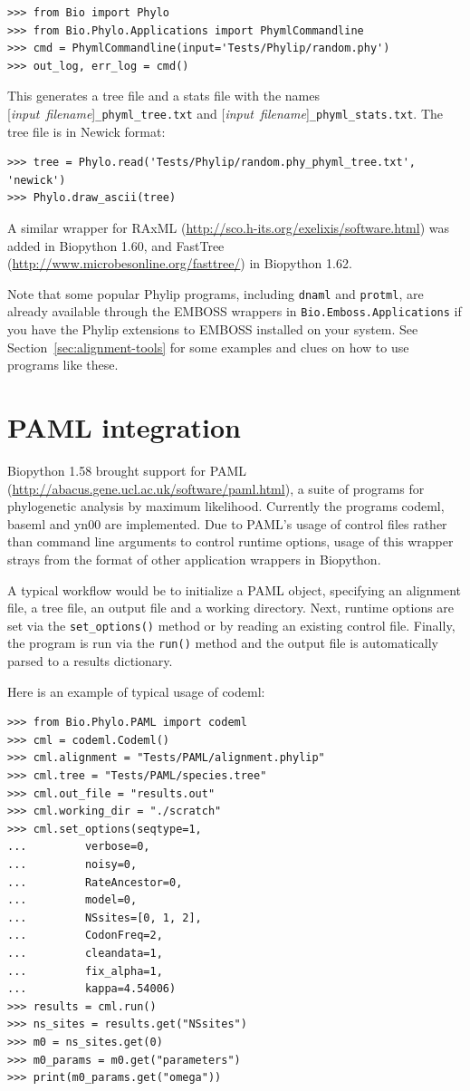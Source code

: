 \documentclass{report}
\begin{document}
\begin{verbatim}
>>> from Bio import Phylo
>>> from Bio.Phylo.Applications import PhymlCommandline
>>> cmd = PhymlCommandline(input='Tests/Phylip/random.phy')
>>> out_log, err_log = cmd()
\end{verbatim}

This generates a tree file and a stats file with the names
[\textit{input~filename}]\verb|_phyml_tree.txt| and
[\textit{input~filename}]\verb|_phyml_stats.txt|. The tree file is in Newick format:

\begin{verbatim}
>>> tree = Phylo.read('Tests/Phylip/random.phy_phyml_tree.txt', 'newick')
>>> Phylo.draw_ascii(tree)
\end{verbatim}

A similar wrapper for RAxML (\url{http://sco.h-its.org/exelixis/software.html})
was added in Biopython 1.60, and FastTree
(\url{http://www.microbesonline.org/fasttree/}) in Biopython 1.62.

Note that some popular Phylip programs, including \texttt{dnaml} and \texttt{protml},
are already available through the EMBOSS wrappers in \texttt{Bio.Emboss.Applications} if
you have the Phylip extensions to EMBOSS installed on your system.
See Section~\ref{sec:alignment-tools} for some examples and clues on how to use
programs like these.


\section{PAML integration}
\label{sec:PhyloPAML}

Biopython 1.58 brought support for PAML
(\url{http://abacus.gene.ucl.ac.uk/software/paml.html}), a suite of programs for
phylogenetic analysis by maximum likelihood. Currently the programs codeml, baseml and 
yn00 are implemented. Due to PAML's usage of control files rather than command line 
arguments to control runtime options, usage of this wrapper strays from the format of 
other application wrappers in Biopython. 

A typical workflow would be to initialize a PAML object, specifying an alignment file, a
tree file, an output file and a working directory. Next, runtime options are set via the
\texttt{set\_options()} method or by reading an existing control file. Finally, the
program is run via the \texttt{run()} method and the output file is automatically parsed
to a results dictionary.

Here is an example of typical usage of codeml:
\begin{verbatim}
>>> from Bio.Phylo.PAML import codeml
>>> cml = codeml.Codeml()
>>> cml.alignment = "Tests/PAML/alignment.phylip"
>>> cml.tree = "Tests/PAML/species.tree"
>>> cml.out_file = "results.out"
>>> cml.working_dir = "./scratch"
>>> cml.set_options(seqtype=1,
...         verbose=0,
...         noisy=0,
...         RateAncestor=0,
...         model=0,
...         NSsites=[0, 1, 2],
...         CodonFreq=2,
...         cleandata=1,
...         fix_alpha=1,
...         kappa=4.54006)
>>> results = cml.run()
>>> ns_sites = results.get("NSsites")
>>> m0 = ns_sites.get(0)
>>> m0_params = m0.get("parameters")
>>> print(m0_params.get("omega"))
\end{verbatim}
\end{document}
